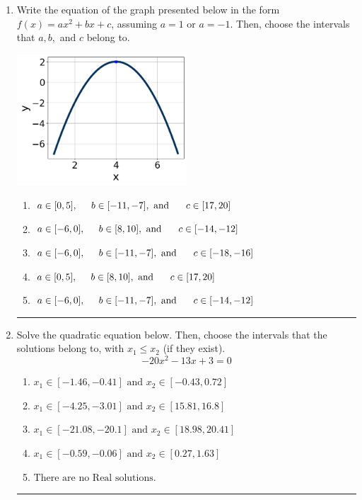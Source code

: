 \documentclass[14pt]{extbook}
\newcommand{\litem}[1]{\item#1\hspace*{-1cm}\rule{\textwidth}{0.4pt}}
\begin{document}
\begin{enumerate}
{\begin{enumerate}[label=\Alph*.]
\end{enumerate} }
\litem{
Write the equation of the graph presented below in the form $f(x)=ax^2+bx+c$, assuming  $a=1$ or $a=-1$. Then, choose the intervals that $a, b,$ and $c$ belong to.
\begin{center}
    \includegraphics[width=0.5\textwidth]{../Figures/quadraticGraphToEquationCopyC.png}
\end{center}
\begin{enumerate}[label=\Alph*.]
\item \( a \in [0, 5], \hspace*{5mm} b \in [-11, -7], \text{ and } \hspace*{5mm} c \in [17, 20] \)
\item \( a \in [-6, 0], \hspace*{5mm} b \in [8, 10], \text{ and } \hspace*{5mm} c \in [-14, -12] \)
\item \( a \in [-6, 0], \hspace*{5mm} b \in [-11, -7], \text{ and } \hspace*{5mm} c \in [-18, -16] \)
\item \( a \in [0, 5], \hspace*{5mm} b \in [8, 10], \text{ and } \hspace*{5mm} c \in [17, 20] \)
\item \( a \in [-6, 0], \hspace*{5mm} b \in [-11, -7], \text{ and } \hspace*{5mm} c \in [-14, -12] \)

\end{enumerate} }
\litem{
Solve the quadratic equation below. Then, choose the intervals that the solutions belong to, with $x_1 \leq x_2$ (if they exist).\[ -20x^{2} -13 x + 3 = 0 \]\begin{enumerate}[label=\Alph*.]
\item \( x_1 \in [-1.46, -0.41] \text{ and } x_2 \in [-0.43, 0.72] \)
\item \( x_1 \in [-4.25, -3.01] \text{ and } x_2 \in [15.81, 16.8] \)
\item \( x_1 \in [-21.08, -20.1] \text{ and } x_2 \in [18.98, 20.41] \)
\item \( x_1 \in [-0.59, -0.06] \text{ and } x_2 \in [0.27, 1.63] \)
\item \( \text{There are no Real solutions.} \)


\end{enumerate}}
\end{enumerate}
\end{document}
